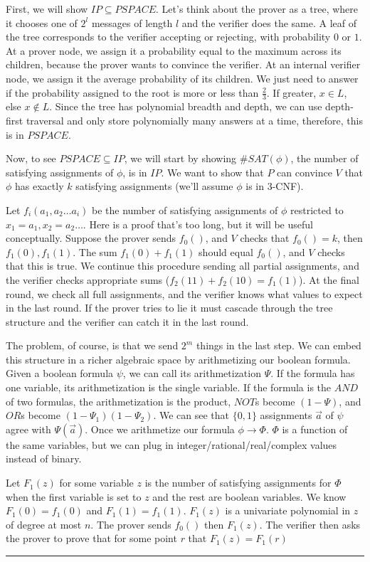 \documentclass[twoside]{article}
\newenvironment{proof}{{\bf Proof:}}{\hfill\rule{2mm}{2mm}}
\begin{document}
\begin{proof}
	
	First, we will show $IP\subseteq PSPACE$.  Let's think about the prover as a tree, where it chooses one of $2^l$ messages of length $l$ and the verifier does the same.  A leaf of the tree corresponds to the verifier accepting or rejecting, with probability $0$ or $1$.  At a prover node, we assign it a probability equal to the maximum across its children, because the prover wants to convince the verifier.  At an internal verifier node, we assign it the average probability of its children.  We just need to answer if the probability assigned to the root is more or less than $\frac{2}{3}$.  If greater, $x\in L$, else $x\notin L$.  Since the tree has polynomial breadth and depth, we can use depth-first traversal and only store polynomially many answers at a time, therefore, this is in $PSPACE$.
	
	Now, to see $PSPACE\subseteq IP$, we will start by showing $\#SAT(\phi)$, the number of satisfying assignments of $\phi$, is in $IP$.  We want to show that $P$ can convince $V$ that $\phi$ has exactly $k$ satisfying assignments (we'll assume $\phi$ is in $3$-CNF).
	
	Let $f_i(a_1,a_2\dots a_i)$ be the number of satisfying assignments of $\phi$ restricted to $x_1=a_1,x_2=a_2\dots$.  Here is a proof that's too long, but it will be useful conceptually.  Suppose the prover sends $f_0()$, and $V$ checks that $f_0()=k$, then $f_1(0),f_1(1)$.  The sum  $f_1(0) +f_1(1)$ should equal $f_0()$, and $V$ checks that this is true.  We continue this procedure sending all partial assignments, and the verifier checks appropriate sums ($f_2(11)+f_2(10)=f_1(1)$).  At the final round, we check all full assignments, and the verifier knows what values to expect in the last round.  If the prover tries to lie it must cascade through the tree structure and the verifier can catch it in the last round.
	
	The problem, of course, is that we send $2^m$ things in the last step. We can embed this structure in a richer algebraic space by arithmetizing our boolean formula.  Given a boolean formula $\psi$, we can call its arithmetization $\Psi$.  If the formula has one variable, its arithmetization is the single variable.  If the formula is the $AND$ of two formulas, the arithmetization is the product, $NOT$s become $(1-\Psi)$, and $OR$s become $(1-\Psi_1)(1-\Psi_2)$.  We can see that $\{0,1\}$ assignments $\vec{a}$ of $\psi$ agree with $\Psi(\vec{a})$.  Once we arithmetize our formula $\phi \rightarrow \Phi$.  $\Phi$ is a function of the same variables, but we can plug in integer/rational/real/complex values instead of binary.
	
	Let $F_1(z)$ for some variable $z$ is the number of satisfying assignments for $\Phi$ when the first variable is set to $z$ and the rest are boolean variables.  We know $F_1(0) = f_1(0)$ and $F_1(1)=f_1(1)$.  $F_1(z)$ is a univariate polynomial in $z$ of degree at most $n$.  The prover sends $f_0()$ then $F_1(z)$.  The verifier then asks the prover to prove that for some point $r$ that $F_1(z)=F_1(r)$
	

	
	
	
	
\end{proof}
\end{document}
